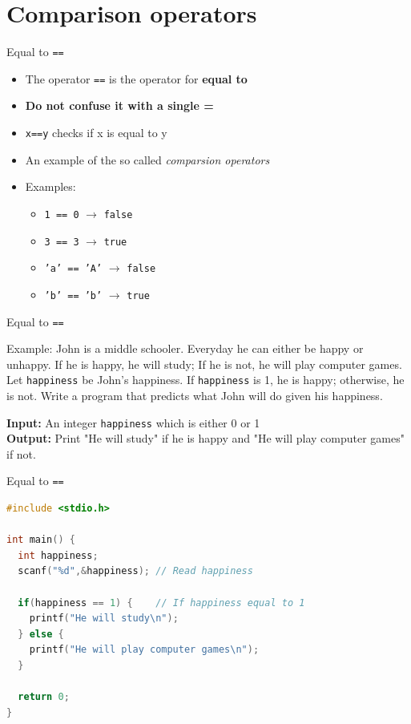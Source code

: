\documentclass[10pt,xcolor={table,dvipsnames},t]{beamer}
\begin{document}
\section{Comparison operators}
\begin{frame}{Equal to \texttt{==}}
  \begin{itemize}
    \item The operator \texttt{==} is the operator for \textbf{equal to}
    \item \textbf{Do not confuse it with a single =}
    \item \texttt{x==y} checks if x is equal to y
    \item An example of the so called \textit{comparsion operators}
    \item Examples:
    \begin{itemize}
      \item \texttt{1 == 0} $\rightarrow$ \texttt{false}
      \item \texttt{3 == 3} $\rightarrow$ \texttt{true}
      \item \texttt{'a' == 'A'} $\rightarrow$ \texttt{false}
      \item \texttt{'b' == 'b'} $\rightarrow$ \texttt{true}
    \end{itemize}
  \end{itemize}
\end{frame}
\begin{frame}{Equal to \texttt{==}}
  \begin{exampleblock}{Example:}
    John is a middle schooler. Everyday he can either be happy or unhappy. If he is happy, he will study; If he is not, he will play computer games. Let \texttt{happiness} be John's happiness. If \texttt{happiness} is 1, he is happy; otherwise, he is not. Write a program that predicts what John will do given his happiness.
  \end{exampleblock}
  \vspace{1mm}
  \textbf{Input:} An integer \texttt{happiness} which is either 0 or 1\\
  \textbf{Output:} Print "He will study" if he is happy and "He will play computer games" if not.
\end{frame}

\begin{frame}[fragile]{Equal to \texttt{==}}
\begin{lstlisting}[language=C]
#include <stdio.h>

int main() {
  int happiness;
  scanf("%d",&happiness); // Read happiness
  
  if(happiness == 1) {    // If happiness equal to 1
    printf("He will study\n");
  } else {
    printf("He will play computer games\n");
  }

  return 0;
}
\end{lstlisting}
\end{frame}
\end{document}
